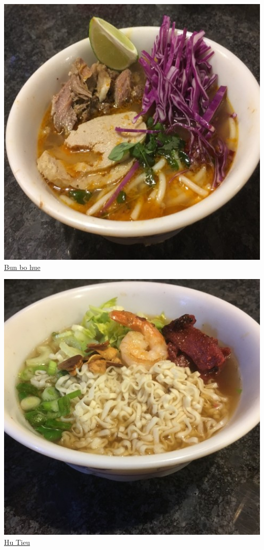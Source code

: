 \documentclass[
]{book}
\begin{document}
\protect\hyperlink{bohue}{\includegraphics[width=1\textwidth,height=\textheight]{bun_bo_hue_small.jpg}}
\protect\hyperlink{bohue}{Bun bo hue}

\protect\hyperlink{hutieu}{\includegraphics[width=1\textwidth,height=\textheight]{hu_tieu_small.jpg}}
\protect\hyperlink{hutieu}{Hu Tieu}
\end{document}
